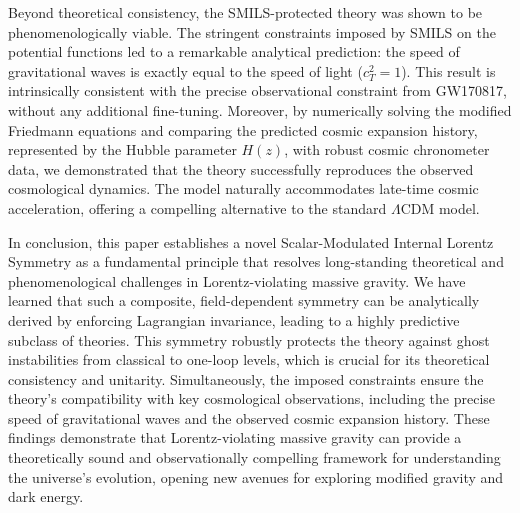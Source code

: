 \documentclass[twocolumn]{aastex631}
\begin{document}
Beyond theoretical consistency, the SMILS-protected theory was shown to be phenomenologically viable. The stringent constraints imposed by SMILS on the potential functions led to a remarkable analytical prediction: the speed of gravitational waves is exactly equal to the speed of light ($c_T^2=1$). This result is intrinsically consistent with the precise observational constraint from GW170817, without any additional fine-tuning. Moreover, by numerically solving the modified Friedmann equations and comparing the predicted cosmic expansion history, represented by the Hubble parameter $H(z)$, with robust cosmic chronometer data, we demonstrated that the theory successfully reproduces the observed cosmological dynamics. The model naturally accommodates late-time cosmic acceleration, offering a compelling alternative to the standard $\Lambda$CDM model.

In conclusion, this paper establishes a novel Scalar-Modulated Internal Lorentz Symmetry as a fundamental principle that resolves long-standing theoretical and phenomenological challenges in Lorentz-violating massive gravity. We have learned that such a composite, field-dependent symmetry can be analytically derived by enforcing Lagrangian invariance, leading to a highly predictive subclass of theories. This symmetry robustly protects the theory against ghost instabilities from classical to one-loop levels, which is crucial for its theoretical consistency and unitarity. Simultaneously, the imposed constraints ensure the theory's compatibility with key cosmological observations, including the precise speed of gravitational waves and the observed cosmic expansion history. These findings demonstrate that Lorentz-violating massive gravity can provide a theoretically sound and observationally compelling framework for understanding the universe's evolution, opening new avenues for exploring modified gravity and dark energy.
\end{document}
